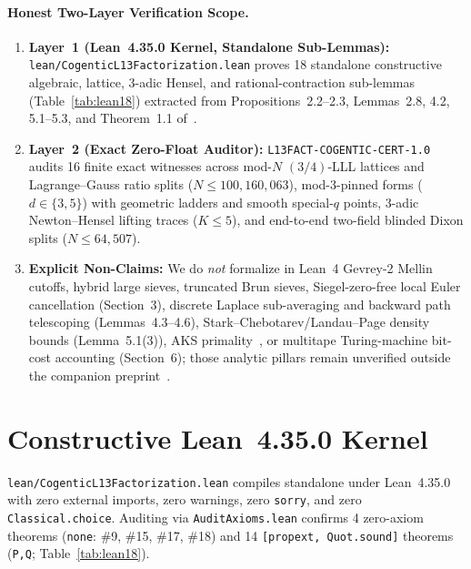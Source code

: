 \documentclass[10pt,twocolumn]{article}
\begin{document}
\paragraph{Honest Two-Layer Verification Scope.}
\begin{enumerate}[leftmargin=1.2em,itemsep=1pt,topsep=2pt]
  \item \textbf{Layer~1 (Lean~4.35.0 Kernel, Standalone Sub-Lemmas):} \texttt{lean/Cogentic\allowbreak L13Factorization.lean} proves 18 standalone constructive algebraic, lattice, 3-adic Hensel, and rational-contraction sub-lemmas (Table~\ref{tab:lean18}) extracted from Propositions~2.2--2.3, Lemmas~2.8, 4.2, 5.1--5.3, and Theorem~1.1 of~\cite{cogentic2026l13factoring}.
  \item \textbf{Layer~2 (Exact Zero-Float Auditor):} \texttt{L13FACT-\allowbreak COGENTIC-\allowbreak CERT-1.0} audits 16 finite exact witnesses across mod-$N$ $(3/4)$-LLL lattices and Lagrange--Gauss ratio splits ($N\le 100{,}160{,}063$), mod-3-pinned forms ($d\in\{3,5\}$) with geometric ladders and smooth special-$q$ points, 3-adic Newton--Hensel lifting traces ($K\le 5$), and end-to-end two-field blinded Dixon splits ($N\le 64{,}507$).
  \item \textbf{Explicit Non-Claims:} We do \emph{not} formalize in Lean~4 Gevrey-2 Mellin cutoffs, hybrid large sieves, truncated Brun sieves, Siegel-zero-free local Euler cancellation (Section~3), discrete Laplace sub-averaging and backward path telescoping (Lemmas~4.3--4.6), Stark--Chebotarev\slash Landau--Page density bounds (Lemma~5.1(3)), AKS primality~\cite{agrawal2004primes}, or multitape Turing-machine bit-cost accounting (Section~6); those analytic pillars remain unverified outside the companion preprint~\cite{cogentic2026l13factoring}.
\end{enumerate}

\section{Constructive Lean~4.35.0 Kernel}\label{sec:lean}
\texttt{lean/Cogentic\allowbreak L13Factorization.lean} compiles standalone under Lean~4.35.0~\cite{demoura2021lean4} with zero external imports, zero warnings, zero \texttt{sorry}, and zero \texttt{Classical.choice}. Auditing via \texttt{AuditAxioms.lean} confirms 4 zero-axiom theorems (\texttt{none}: \#9, \#15, \#17, \#18) and 14 \texttt{[propext, Quot.sound]} theorems (\texttt{P,Q}; Table~\ref{tab:lean18}).
\end{document}
